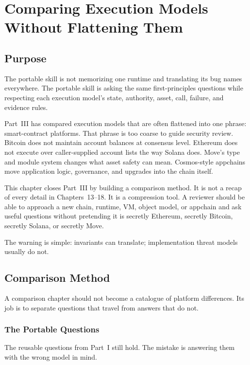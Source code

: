 \chapter{Comparing Execution Models Without Flattening Them}

\section{Purpose}

\begin{principlebox}
The portable skill is not memorizing one runtime and translating its bug names everywhere. The portable skill is asking the same first-principles questions while respecting each execution model's state, authority, asset, call, failure, and evidence rules.
\end{principlebox}

Part~III has compared execution models that are often flattened into one phrase: smart-contract platforms. That phrase is too coarse to guide security review. Bitcoin does not maintain account balances at consensus level. Ethereum does not execute over caller-supplied account lists the way Solana does. Move's type and module system changes what asset safety can mean. Cosmos-style appchains move application logic, governance, and upgrades into the chain itself.

This chapter closes Part~III by building a comparison method. It is not a recap of every detail in Chapters~13--18. It is a compression tool. A reviewer should be able to approach a new chain, runtime, VM, object model, or appchain and ask useful questions without pretending it is secretly Ethereum, secretly Bitcoin, secretly Solana, or secretly Move.

The warning is simple: invariants can translate; implementation threat models usually do not.

\section{Comparison Method}

A comparison chapter should not become a catalogue of platform differences. Its job is to separate questions that travel from answers that do not.

\subsection{The Portable Questions}

The reusable questions from Part~I still hold. The mistake is answering them with the wrong model in mind.

